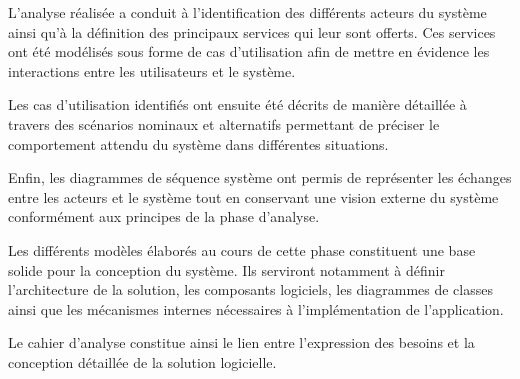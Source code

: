 \documentclass[
]{article}
\begin{document}
L'analyse réalisée a conduit à l'identification des différents acteurs
du système ainsi qu'à la définition des principaux services qui leur
sont offerts. Ces services ont été modélisés sous forme de cas
d'utilisation afin de mettre en évidence les interactions entre les
utilisateurs et le système.

Les cas d'utilisation identifiés ont ensuite été décrits de manière
détaillée à travers des scénarios nominaux et alternatifs permettant de
préciser le comportement attendu du système dans différentes situations.

Enfin, les diagrammes de séquence système ont permis de représenter les
échanges entre les acteurs et le système tout en conservant une vision
externe du système conformément aux principes de la phase d'analyse.

Les différents modèles élaborés au cours de cette phase constituent une
base solide pour la conception du système. Ils serviront notamment à
définir l'architecture de la solution, les composants logiciels, les
diagrammes de classes ainsi que les mécanismes internes nécessaires à
l'implémentation de l'application.

Le cahier d'analyse constitue ainsi le lien entre l'expression des
besoins et la conception détaillée de la solution logicielle.
\end{document}
